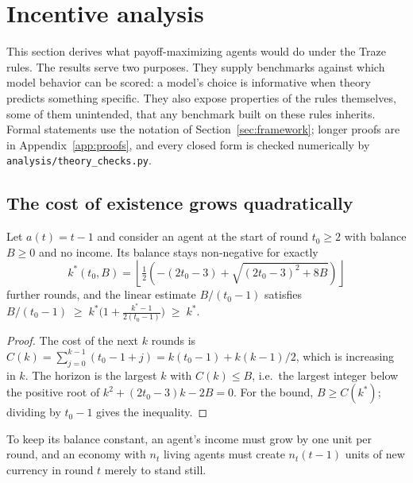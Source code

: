 \section{Incentive analysis}
\label{sec:theory}

This section derives what payoff-maximizing agents would do under the Traze rules.
The results serve two purposes.
They supply benchmarks against which model behavior can be scored: a model's choice is informative when theory predicts something specific.
They also expose properties of the rules themselves, some of them unintended, that any benchmark built on these rules inherits.
Formal statements use the notation of Section~\ref{sec:framework}; longer proofs are in Appendix~\ref{app:proofs}, and every closed form is checked numerically by \texttt{analysis/theory\_checks.py}.

\subsection{The cost of existence grows quadratically}
\label{sec:theory-aging}

\begin{proposition}
\label{prop:aging}
Let $a(t)=t-1$ and consider an agent at the start of round $t_0\ge 2$ with balance $B\ge 0$ and no income.
Its balance stays non-negative for exactly
\begin{equation}
  k^\ast(t_0,B)=\left\lfloor \tfrac12\left(-(2t_0-3)+\sqrt{(2t_0-3)^2+8B}\right)\right\rfloor
\end{equation}
further rounds, and the linear estimate $B/(t_0-1)$ satisfies
$B/(t_0-1)\;\ge\;k^\ast\bigl(1+\tfrac{k^\ast-1}{2(t_0-1)}\bigr)\;\ge\;k^\ast$.
\end{proposition}

\begin{proof}
The cost of the next $k$ rounds is $C(k)=\sum_{j=0}^{k-1}(t_0-1+j)=k(t_0-1)+k(k-1)/2$, which is increasing in $k$.
The horizon is the largest $k$ with $C(k)\le B$, i.e.\ the largest integer below the positive root of $k^2+(2t_0-3)k-2B=0$.
For the bound, $B\ge C(k^\ast)$; dividing by $t_0-1$ gives the inequality.
\end{proof}

\begin{corollary}
\label{cor:redqueen}
To keep its balance constant, an agent's income must grow by one unit per round, and an economy with $n_t$ living agents must create $n_t(t-1)$ units of new currency in round $t$ merely to stand still.
\end{corollary}

